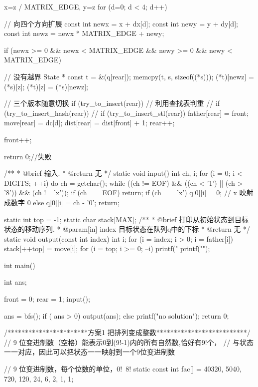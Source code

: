 \begin{Codex}[label=eight_digits_bfs.c]
{{        x=z / MATRIX_EDGE, y=z %
        for (d=0; d < 4; d++) {  // 向四个方向扩展
            const int newx = x + dx[d];
            const int newy = y + dy[d];
            const int newz = newx * MATRIX_EDGE + newy;

            if (newx >= 0 && newx < MATRIX_EDGE && newy >= 0 &&
                newy < MATRIX_EDGE) { // 没有越界
                State * const t = &(q[rear]);
                memcpy(t, s, sizeof((*s)));
                (*t)[newz] = (*s)[z];
                (*t)[z] = (*s)[newz];

                // 三个版本随意切换
                if (try_to_insert(rear)) { // 利用查找表判重
                // if (try_to_insert_hash(rear)) {
                // if (try_to_insert_stl(rear)) {
                    father[rear] = front;
                    move[rear] = dc[d];
                    dist[rear] = dist[front] + 1;
                    rear++;
                } 
            }
        }

        front++;
    }

    return 0;//失败 
}


/**
 * @brief 输入.
 * @return 无
 */
static void input() {
    int ch, i;
    for (i = 0; i < DIGITS; ++i) {
        do {
            ch = getchar();
        } while ((ch != EOF) && ((ch < '1') || (ch > '8')) && (ch != 'x'));
        if (ch == EOF) return;
        if (ch == 'x') q[0][i] = 0; // x 映射成数字 0
        else           q[0][i] = ch - '0';
    }
    return;
}

static int top = -1;
static char stack[MAX];
/**
 * @brief 打印从初始状态到目标状态的移动序列.
 * @param[in] index 目标状态在队列q中的下标
 * @return 无
 */
static void output(const int index) {
    int i;
    for (i = index; i > 0; i = father[i]) {
        stack[++top] = move[i];
    }
    for (i = top; i >= 0; --i) {
        printf("%
    }
    printf("\n");
}

int main() {
    int ans;

    front = 0; rear = 1;
    input();
    
    ans = bfs();
    if ( ans > 0) {
        output(ans);
    } else {
        printf("no solution\n");
    }
    return 0;
}

/***********************方案1 把排列变成整数**************************/
// 9 位变进制数（空格）能表示0到(9!-1)内的所有自然数,恰好有9!个，
// 与状态一一对应，因此可以把状态一一映射到一个9位变进制数

// 9 位变进制数，每个位数的单位，0!~8!
static const int fac[] = {40320, 5040, 720, 120, 24, 6, 2, 1, 1};

}}
\end{Codex}
